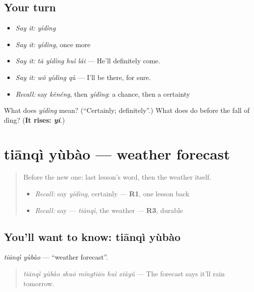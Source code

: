 \subsection*{Your turn}
\begin{itemize}
\raggedright
  \item \emph{Say it:} \emph{yídìng}
  \item \emph{Say it:} \emph{yídìng}, once more
  \item \emph{Say it:} \emph{tā yídìng huì lái} — He'll definitely come.
  \item \emph{Say it:} \emph{wǒ yídìng qù} — I'll be there, for sure.
  \item \emph{Recall:} say \emph{kěnéng}, then \emph{yídìng}: a chance, then a certainty
\end{itemize}

\begin{tcolorbox}[breakable,colback=teal!4,colframe=teal!35!black,title={Before you move on}]
What does \emph{yídìng} mean? (\textquotedblleft{}Certainly; definitely\textquotedblright{}.) What does  do before the fall of dìng? (\textbf{It rises: \emph{yí}}.)
\end{tcolorbox}
\section[tiānqì yùbào]{tiānqì yùbào — weather forecast}

\label{lesson:ZH-C147-tianqi-yubao}



\begin{quote}
Before the new one: last lesson's word, then the weather itself.

\begin{itemize}
\raggedright
  \item \emph{Recall:} say \emph{yídìng}, certainly — \textbf{R1}, one lesson back
  \item \emph{Recall:} say  — \emph{tiānqì}, the weather — \textbf{R3}, durable
\end{itemize}
\end{quote}

\subsection*{You'll want to know: tiānqì yùbào}
\emph{tiānqì yùbào} — \textquotedblleft{}weather forecast\textquotedblright{}.

\begin{quote}
\emph{tiānqì yùbào shuō míngtiān huì xiàyǔ} — The forecast says it'll rain tomorrow.
\end{quote}

